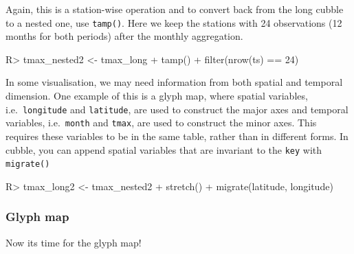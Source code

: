 \documentclass[
]{jss}
\begin{document}
Again, this is a station-wise operation and to convert back from the
long cubble to a nested one, use \texttt{tamp()}. Here we keep the
stations with 24 observations (12 months for both periods) after the
monthly aggregation.

\begin{CodeChunk}
\begin{CodeInput}
R> tmax_nested2 <- tmax_long %
+   tamp() %
+   filter(nrow(ts) == 24)
\end{CodeInput}
\end{CodeChunk}

In some visualisation, we may need information from both spatial and
temporal dimension. One example of this is a glyph map, where spatial
variables, i.e.~\texttt{longitude} and \texttt{latitude}, are used to
construct the major axes and temporal variables, i.e.~\texttt{month} and
\texttt{tmax}, are used to construct the minor axes. This requires these
variables to be in the same table, rather than in different forms. In
cubble, you can append spatial variables that are invariant to the
\texttt{key} with \texttt{migrate()}

\begin{CodeChunk}
\begin{CodeInput}
R> tmax_long2 <- tmax_nested2 %
+   stretch() %
+   migrate(latitude, longitude)
\end{CodeInput}
\end{CodeChunk}

\hypertarget{glyph-map}{%
\subsubsection{Glyph map}\label{glyph-map}}

Now its time for the glyph map!
\end{document}
